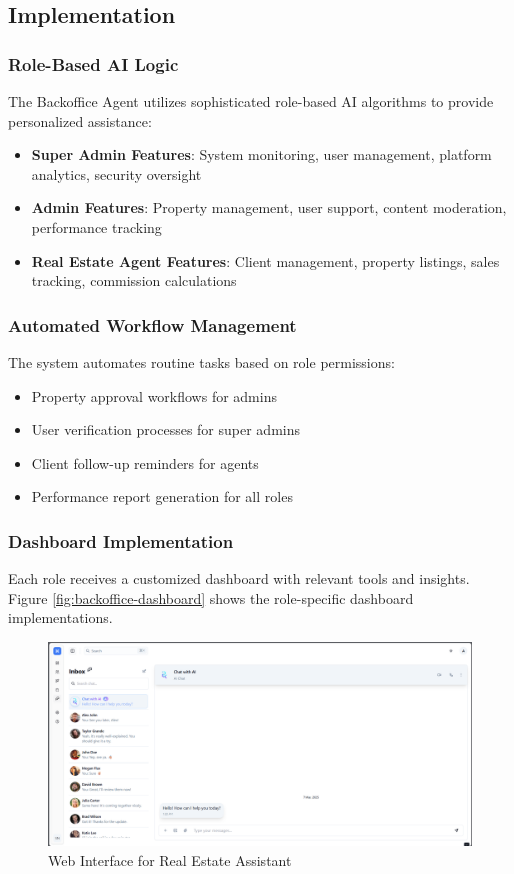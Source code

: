 \subsection{Implementation}
\subsubsection{Role-Based AI Logic}
The Backoffice Agent utilizes sophisticated role-based AI algorithms to provide personalized assistance:

\begin{itemize}
    \item \textbf{Super Admin Features}: System monitoring, user management, platform analytics, security oversight
    \item \textbf{Admin Features}: Property management, user support, content moderation, performance tracking
    \item \textbf{Real Estate Agent Features}: Client management, property listings, sales tracking, commission calculations
\end{itemize}

\subsubsection{Automated Workflow Management}
The system automates routine tasks based on role permissions:
\begin{itemize}
    \item Property approval workflows for admins
    \item User verification processes for super admins
    \item Client follow-up reminders for agents
    \item Performance report generation for all roles
\end{itemize}

\newpage
\subsubsection{Dashboard Implementation}
Each role receives a customized dashboard with relevant tools and insights. Figure \ref{fig:backoffice-dashboard} shows the role-specific dashboard implementations.

\begin{figure}[htbp]
    \centering
    \includegraphics[width=1\textwidth]{images/assistant_web_interface.png}
    \caption{Web Interface for Real Estate Assistant}
    \label{fig:assistant-web-interface}
\end{figure}


